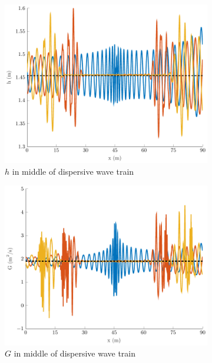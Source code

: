 \documentclass[10pt]{elsarticle}
\begin{document}
\begin{figure}
	\centering
	\begin{subfigure}{0.32\textwidth}
		\centering
		\includegraphics[width=\textwidth]{./Figures/Simulations/Study/ImpDisp/hMiddle.pdf}
		\caption{$h$ in middle of dispersive wave train}
	\end{subfigure}
	\begin{subfigure}{0.32\textwidth}
		\centering
		\includegraphics[width=\textwidth]{./Figures/Simulations/Study/ImpDisp/GMiddle.pdf}
		\caption{$G$ in middle of dispersive wave train}
	\end{subfigure}
	\begin{subfigure}{0.32\textwidth}

\end{subfigure}
\end{figure}
\end{document}
